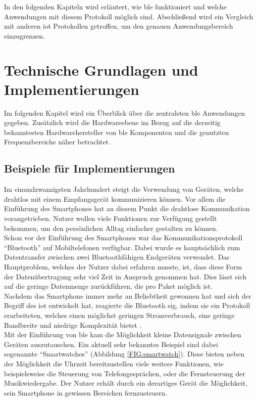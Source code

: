 \noindent In den folgenden Kapiteln wird erläutert, wie \ac{ble} funktioniert und welche Anwendungen mit diesem Protokoll möglich sind. Abschließend wird ein Vergleich mit anderen \ac{iot} Protokollen getroffen, um den genauen Anwendungsbereich einzugrenzen.\\   

\section{Technische Grundlagen und Implementierungen}
\label{s:grundlagen}

Im folgenden Kapitel wird ein Überblick über die zentralsten \ac{ble} Anwendungen gegeben. Zusätzlich wird die Hardwareebene im Bezug auf die derzeitig bekanntesten Hardwarehersteller von \ac{ble} Komponenten und die genutzten Frequenzbereiche näher betrachtet. 

\subsection{Beispiele für Implementierungen}
\label{ss:grundlagen:beispiele}

Im einundzwanzigsten Jahrhundert steigt die Verwendung von Geräten, welche drahtlos mit einem Empfangsgerät kommunizieren können. Vor allem die Einführung des Smartphones hat an diesem Punkt die drahtlose Kommunikation vorangetrieben. Nutzer wollen viele Funktionen zur Verfügung gestellt bekommen, um den persönlichen Alltag einfacher gestalten zu können.\\

\noindent Schon vor der Einführung des Smartphones war das Kommunikationsprotokoll "`Bluetooth"' auf Mobiltelefonen verfügbar. Dabei wurde es hauptsächlich zum Datentransfer zwischen zwei Bluetoothfähigen Endgeräten verwendet. Das Hauptproblem, welches der Nutzer dabei erfahren musste, ist, dass diese Form der Datenübertragung sehr viel Zeit in Anspruch genommen hat. Dies lässt sich auf die geringe Datenmenge zurückführen, die pro Paket möglich ist.\\

\noindent Nachdem das Smartphone immer mehr an Beliebtheit gewonnen hat und sich der Begriff des \ac{iot} entwickelt hat, reagierte die Bluetooth \ac{sig}, indem sie ein Protokoll erarbeiteten, welches einen möglichst geringen Stromverbrauch, eine geringe Bandbreite und niedrige Komplexität bietet \cite[Seite 1]{Townsend14:GSB}.\\

\noindent Mit der Einführung von \ac{ble} kam die Möglichkeit kleine Datensignale zwischen Geräten auszutauschen. Ein aktuell sehr bekanntes Beispiel sind dabei sogenannte "`Smartwatches"' (Abbildung \ref{FIG:smartwatch}). Diese bieten neben der Möglichkeit die Uhrzeit bereitzustellen viele weitere Funktionen, wie beispielsweise die Steuerung von Telefongesprächen, oder die Fernsteuerung der Musikwiedergabe. Der Nutzer erhält durch ein derartiges Gerät die Möglichkeit, sein Smartphone in gewissen Bereichen fernzusteuern.\\

